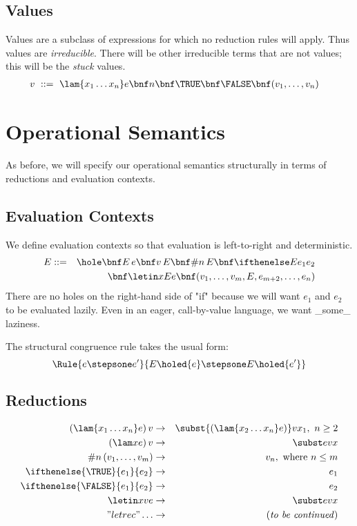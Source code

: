 \subsection{Values}
Values are a subclass of expressions for which no reduction rules will apply. Thus values are \emph{irreducible}. There will be other irreducible terms that are not values; this will be the \emph{stuck} values.
\begin{align*}
v\ &::=\ \lam{x_1\ldots x_n}e \bnf n \bnf \TRUE \bnf \FALSE \bnf (v_1,\ldots,v_n) 
\end{align*}

\section{Operational Semantics}

As before, we will specify our operational semantics structurally in terms of reductions and evaluation contexts.

\subsection{Evaluation Contexts}
We define evaluation contexts so that evaluation is left-to-right and deterministic.
\begin{eqnarray*}
E &::=& \hole \bnf E\,e \bnf v\,E \bnf \#n\,E \bnf \ifthenelse E{e_1}{e_2}\\
&& \bnf \letin xEe \bnf (v_1,\ldots,v_m,E,e_{m+2},\ldots,e_n) 
\end{eqnarray*}
There are no holes on the right-hand side of "if" because
we will want $e_1$ and $e_2$ to be evaluated lazily. Even
in an eager, call-by-value language, we want _some_ laziness.

The structural congruence rule takes the usual form:
\[
\Rule{e \stepsone e'}
{E\holed{e} \stepsone E\holed{e'}}
\]

\subsection{Reductions}
\begin{eqnarray*}
(\lam{x_1\ldots x_n}e)\,v &\to& \subst{(\lam{x_2\ldots x_n}e)}v{x_1},\ n\geq 2\\
(\lam xe)\,v &\to& \subst evx\\
\#n\,(v_1,\ldots,v_m) &\to& v_n,\ \mbox{where $n\leq m$}\\
\ifthenelse{\TRUE}{e_1}{e_2} &\to& e_1\\
\ifthenelse{\FALSE}{e_1}{e_2} &\to& e_2\\
\letin xve &\to& \subst evx\\
"letrec" \ldots &\to& \text{(\textit{to be continued})}
\end{eqnarray*}

